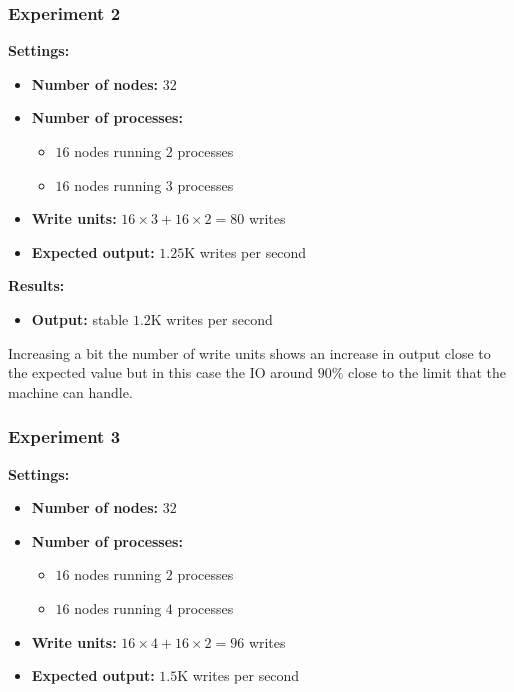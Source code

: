 \subsubsection{Experiment 2}\label{subsubsec:appendix_benchmarks_exp2}
\medskip
\noindent\textbf{Settings:}
\begin{itemize}
 \item \textbf{Number of nodes:} $32$
 \item \textbf{Number of processes:}
 \begin{itemize}
  \item$16$ nodes running $2$ processes
  \item$16$ nodes running $3$ processes
 \end{itemize}
 \item \textbf{Write units:} $16 \times 3 + 16 \times 2 = 80$ writes
 \item \textbf{Expected output:} $1.25$K writes per second
\end{itemize}

\medskip
\noindent\textbf{Results:}
\begin{itemize}
 \item \textbf{Output:} stable $1.2$K writes per second
\end{itemize}

Increasing a bit the number of write units shows an increase in output close to the expected value but in this case the IO around $90\%$ close to the limit that the machine can handle.

\subsubsection{Experiment 3}\label{subsubsec:appendix_benchmarks_exp3}
\medskip
\noindent\textbf{Settings:}
\begin{itemize}
 \item \textbf{Number of nodes:} $32$
 \item \textbf{Number of processes:}
 \begin{itemize}
  \item$16$ nodes running $2$ processes
  \item$16$ nodes running $4$ processes
 \end{itemize}
 \item \textbf{Write units:} $16 \times 4 + 16 \times 2 = 96$ writes
 \item \textbf{Expected output:} $1.5$K writes per second
\end{itemize}

